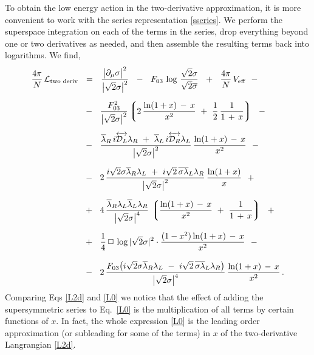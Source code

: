 \documentclass[epsfig,12pt]{article}
\newcommand{\cell}{{\mathcal L}}
\newcommand{\p}{\partial}
\newcommand{\ov}{\overline}
\newcommand{\md}{\mathcal{D}}
\newcommand{\lgr}{\left\lgroup}
\newcommand{\rgr}{\right\rgroup}
\begin{document}
	To obtain the low energy action in the two-derivative approximation,
	it is more convenient to work with the series representation \eqref{sseries}.
	We perform the superspace integration on each of the terms in the series,
	drop everything beyond one or two derivatives as needed,
	and then assemble the resulting terms back into logarithms.
	We find,
\begin{align}
%
\notag
	\frac{4\pi}{N}\, \cell_\text{two deriv} &    ~~=~~  
	\frac{ \big|\p_\mu \sigma\big|^2 }
	{ \big|\sqrt{2}\sigma\big|^2 }
	~~-~~
	F_{03}\, \log\, \frac{\sqrt{2}\sigma}{\sqrt{2}\ov\sigma}
	~~+~~
	\frac{4\pi}{N}\, V_\text{eff}
	~~-
	\\[2mm]
%
\notag
	&
	~~-~~
	\frac{F_{03}^2}{\big|\sqrt{2}\sigma\big|^2}
	\lgr 2\, \frac{ \ln (1 + x) \,-\, x } { x^2 }  ~+~
		\frac{1}{2}\, \frac{1}{1 \,+\, x} \rgr
	~~-
	\\[2mm]
%
\notag
	&
	~~-~~
	\frac{
		\ov\lambda{}_R\, i\overleftrightarrow{\md_L} \lambda_R  ~+~ 
		\ov\lambda{}_L\, i\overleftrightarrow{\md_R} \lambda_L
	} { \big|\sqrt{2}\sigma\big|^2 }
	\,
	\frac{ \ln (1 + x) \,-\, x } { x^2 }
	~~-
	\\[2mm]
%
\label{L2d}
	&
	~~-~~ 
	2\,\frac{
		i\sqrt{2}\sigma\ov\lambda{}_R\lambda_L  ~+~  
		i\sqrt{2}\,\ov{\sigma\lambda}{}_L\lambda_R
	} { \big|\sqrt{2}\sigma\big|^2 }\,
	\frac{ \ln (1 + x) } { x }
	~~+
	\\[2mm]
%
\notag
	&
	~~+~~
	4\,\frac{
		\ov\lambda{}_R \lambda_L \ov\lambda{}_L \lambda_R
	} { \big|\sqrt{2}\sigma\big|^4 }\,
	\lgr \frac{ \ln (1 + x) \,-\, x } { x^2 }  ~+~
		\frac{1}{1 \,+\, x} \rgr
	~~+
	\\[2mm]
%
\notag
	&
	~~+~~
	\frac{1}{4}\,\Box\,\log |\sqrt{2}\sigma|^2 \cdot
	\frac{ (1 - x^2) \ln (1 + x) \,-\, x } { x^2 }
	~~-
	\\[3mm]
%
\notag
	&
	~~-~~
	2\,\frac{ F_{03} \big( i\sqrt{2}\sigma\ov\lambda{}_R\lambda_L ~-~
			       i\sqrt{2}\,\ov{\sigma\lambda}{}_L\lambda_R \big) }
		{ \big|\sqrt{2}\sigma\big|^4 }\,
	\frac{ \ln (1 + x) \,-\, x } { x^2 }\,.
\end{align}
	Comparing Eqs \eqref{L2d} and \eqref{L0} we notice that the effect of adding 
	the supersymmetric series to Eq.~\eqref{L0} is the multiplication of all terms 
	by certain functions of $ x $.
	In fact, the whole expression \eqref{L0}
	is the leading order approximation (or subleading for some of the terms) in $ x $ of 
	the two-derivative Langrangian \eqref{L2d}.
\end{document}
